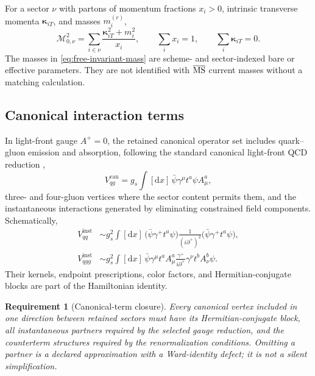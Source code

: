 \documentclass[11pt]{article}
\newtheorem{requirement}[definition]{Requirement}
\newcommand{\dd}{\mathrm{d}}
\newcommand{\cM}{\mathcal M}
\newcommand{\inst}{\mathrm{inst}}
\newcommand{\can}{\mathrm{can}}
\begin{document}
For a sector \(\nu\) with partons of momentum fractions \(x_i>0\), intrinsic
transverse momenta \(\bm\kappa_{iT}\), and masses \(m_i^{(r)}\),
\begin{equation}
 \cM_{0,\nu}^{2}
 =\sum_{i\in\nu}
 \frac{\bm\kappa_{iT}^{2}+m_i^{2}}{x_i},
 \qquad
 \sum_i x_i=1,
 \qquad
 \sum_i\bm\kappa_{iT}=0.
 \label{eq:free-invariant-mass}
\end{equation}
The masses in \cref{eq:free-invariant-mass} are scheme- and sector-indexed bare
or effective parameters.  They are not identified with \(\overline{\rm MS}\)
current masses without a matching calculation.

\subsection{Canonical interaction terms}

In light-front gauge \(A^+=0\), the retained canonical operator set includes
quark--gluon emission and absorption, following the standard canonical
light-front QCD reduction \cite{BrodskyPauliPinsky1998},
\begin{equation}
 V_{qg}^{\can}
 =g_s\int [\dd x]\,
 \bar\psi\gamma^\mu t^a\psi A_\mu^a,
 \label{eq:qg-vertex}
\end{equation}
three- and four-gluon vertices where the sector content permits them, and the
instantaneous interactions generated by eliminating constrained field
components.  Schematically,
\begin{align}
 V_{qq}^{\inst}
 &\sim g_s^2
 \int [\dd x]\,
 \bigl(\bar\psi\gamma^+t^a\psi\bigr)
 \frac{1}{(i\partial^+)^2}
 \bigl(\bar\psi\gamma^+t^a\psi\bigr),
 \label{eq:instantaneous-quark}\\
 V_{qgg}^{\inst}
 &\sim g_s^2
 \int [\dd x]\,
 \bar\psi\gamma^\mu t^a A^a_\mu
 \frac{\gamma^+}{i\partial^+}
 \gamma^\nu t^b A^b_\nu\psi .
 \label{eq:instantaneous-fermion}
\end{align}
Their kernels, endpoint prescriptions, color factors, and Hermitian-conjugate
blocks are part of the Hamiltonian identity.

\begin{requirement}[Canonical-term closure]
Every canonical vertex included in one direction between retained sectors must
have its Hermitian-conjugate block, all instantaneous partners required by the
selected gauge reduction, and the counterterm structures required by the
renormalization conditions.  Omitting a partner is a declared approximation
with a Ward-identity defect; it is not a silent simplification.
\label{req:canonical-closure}
\end{requirement}
\end{document}
